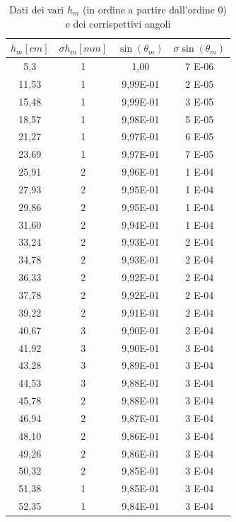 \documentclass[10pt, a4paper, italian]{article}
\begin{document}
\begin{table}[]
\centering
\begin{tabular}{cc|cc}
\toprule
$h_m [cm]$ & $\sigma h_m [mm]$ & $\sin(\theta _m)$ & $\sigma \sin(\theta _m)$\\
\midrule
5,3 & 1 & 1,00 & 7 E-06 \\
11,53 & 1 & 9,99E-01 & 2 E-05 \\
15,48 & 1 & 9,99E-01 & 3 E-05 \\
18,57 & 1 & 9,98E-01 & 5 E-05 \\
21,27 & 1 & 9,97E-01 & 6 E-05 \\
23,69 & 1 & 9,97E-01 & 7 E-05 \\
25,91 & 2 & 9,96E-01 & 1 E-04 \\
27,93 & 2 & 9,95E-01 & 1 E-04 \\
29,86 & 2 & 9,95E-01 & 1 E-04 \\
31,60 & 2 & 9,94E-01 & 1 E-04 \\
33,24 & 2 & 9,93E-01 & 2 E-04 \\
34,78 & 2 & 9,93E-01 & 2 E-04 \\
36,33 & 2 & 9,92E-01 & 2 E-04 \\
37,78 & 2 & 9,92E-01 & 2 E-04 \\
39,22 & 2 & 9,91E-01 & 2 E-04 \\
40,67 & 3 & 9,90E-01 & 2 E-04 \\
41,92 & 3 & 9,90E-01 & 3 E-04 \\
43,28 & 3 & 9,89E-01 & 3 E-04 \\
44,53 & 3 & 9,88E-01 & 3 E-04 \\
45,78 & 2 & 9,88E-01 & 3 E-04 \\
46,94 & 2 & 9,87E-01 & 3 E-04 \\
48,10 & 2 & 9,86E-01 & 3 E-04 \\
49,26 & 2 & 9,86E-01 & 3 E-04 \\
50,32 & 2 & 9,85E-01 & 3 E-04 \\
51,38 & 1 & 9,85E-01 & 3 E-04 \\
52,35 & 1 & 9,84E-01 & 3 E-04
\end{tabular}
\caption{Dati dei vari $h_m$ (in ordine a partire dall'ordine 0) e dei corrispettivi angoli \label{hm}}
\end{table}
\end{document}
